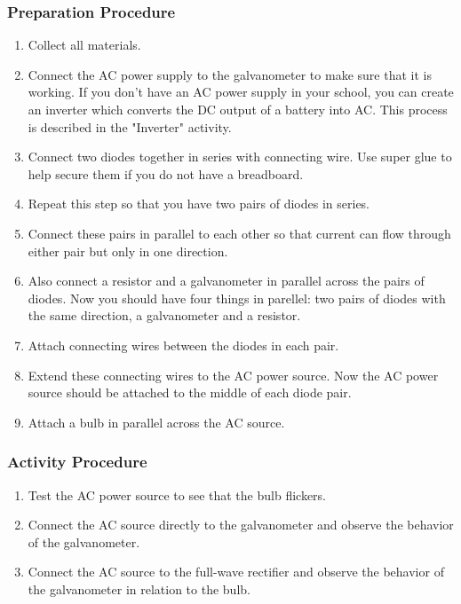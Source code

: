 \subsubsection*{Preparation Procedure}
\begin{enumerate}
\item{Collect all materials.}
\item{Connect the AC power supply to the galvanometer to make sure that it is working.  If you don't have an AC power supply in your school, you can create an inverter which converts the DC output of a battery into AC.  This process is described in the "Inverter" activity.}
\item{Connect two diodes together in series with connecting wire.  Use super glue to help secure them if you do not have a breadboard.}
\item{Repeat this step so that you have two pairs of diodes in series.}
\item{Connect these pairs in parallel to each other so that current can flow through either pair but only in one direction.}
\item{Also connect a resistor and a galvanometer in parallel across the pairs of diodes.  Now you should have four things in parellel: two pairs of diodes with the same direction, a galvanometer and a resistor.}
\item{Attach connecting wires between the diodes in each pair.}
\item{Extend these connecting wires to the AC power source.  Now the AC power source should be attached to the middle of each diode pair.}
\item{Attach a bulb in parallel across the AC source.}
\end{enumerate}

\subsubsection*{Activity Procedure}
\begin{enumerate}
\item{Test the AC power source to see that the bulb flickers.}
\item{Connect the AC source directly to the galvanometer and observe the behavior of the galvanometer.}
\item{Connect the AC source to the full-wave rectifier and observe the behavior of the galvanometer in relation to the bulb.}
\end{enumerate}

